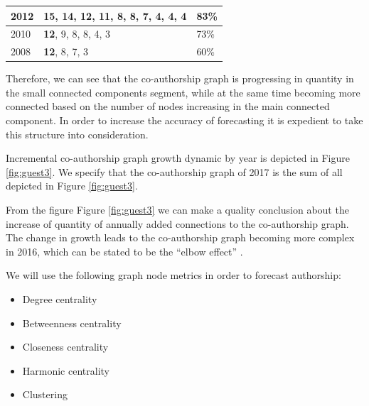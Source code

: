 \documentclass[12pt]{report}
\theoremstyle{definition}
\providecommand{\tightlist}{%
	\setlength{\itemsep}{0pt}\setlength{\parskip}{0pt}}
\begin{document}
\begin{table}[!ht]
\begin{tabular}{@{}|l|l|l|@{}}
		2012          & \textbf{15}, 14, 12, 11, 8, 8, 7, 4, 4, 4                                                                                         & 83\%                                                                        \\ \midrule
		2010          & \textbf{12}, 9, 8, 8, 4, 3                                                                                                        & 73\%                                                                        \\ \midrule
		2008          & \textbf{12}, 8, 7, 3                                                                                                              & 60\%                                                                        \\ \bottomrule
	\end{tabular}
\end{table}

Therefore, we can see that the co-authorship graph is progressing in quantity in the small connected components segment, while at the same time becoming more connected based on the number of nodes increasing in the main connected component. In order to increase the accuracy of forecasting it is expedient to take this structure into consideration. 

Incremental co-authorship graph growth dynamic by year is depicted in Figure \ref{fig:guest3}. We specify that the co-authorship graph of 2017 is the sum of all depicted in Figure \ref{fig:guest3}.


From the figure Figure \ref{fig:guest3} we can make a quality conclusion about the increase of quantity of annually added connections to the co-authorship graph. The change in growth leads to the co-authorship graph becoming more complex in 2016, which can be stated to be the ``elbow effect'' \cite{ketchen1996application}.

We will use the following graph node metrics in order to forecast authorship:

\begin{itemize}
	\tightlist
	\item Degree centrality
	\item Betweenness centrality
	\item Closeness centrality
	\item Harmonic centrality
	\item Clustering
\end{itemize}
\end{document}
